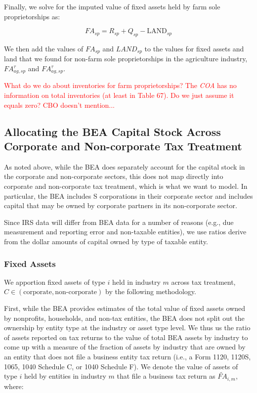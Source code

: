 \documentclass[article,11pt,letterpaper,fleqn]{article}
\theoremstyle{definition}
\numberwithin{equation}{section}
\begin{document}
Finally, we solve for the imputed value of fixed assets held by farm sole proprietorships as: 

\begin{equation}
{FA}_{sp}=R_{sp}+Q_{sp}-\text{LAND}_{sp}
\end{equation}

We then add the values of ${FA}_{sp}$ and ${LAND}_{sp}$ to the values for fixed assets and land that we found for non-farm sole proprietorships in the agriculture industry, ${FA}^{\tau}_{ag,sp}$ and ${FA}^{\tau}_{ag,sp}$.

\textcolor{red}{What do we do about inventories for farm proprietorships?  The \emph{COA} has no information on total inventories (at least in Table 67).   Do we just assume it equals zero?  CBO doesn't mention...}


\subsection{Allocating the BEA Capital Stock Across Corporate and Non-corporate Tax Treatment} 

As noted above, while the BEA does separately account for the capital stock in the corporate and non-corporate sectors, this does not map directly into corporate and non-corporate tax treatment, which is what we want to model.  In particular, the BEA includes S corporations in their corporate sector and includes capital that may be owned by corporate partners in its non-corporate sector.  

Since IRS data will differ from BEA data for a number of reasons (e.g., due measurement and reporting error and non-taxable entities), we use ratios derive from the dollar amounts of capital owned by type of taxable entity. 

\subsubsection{Fixed Assets}
We apportion fixed assets of type $i$ held in industry $m$ across tax treatment, $C\in(\text{corporate},\text{non-corporate})$ by the following methodology.

First, while the BEA provides estimates of the total value of fixed assets owned by nonprofits, households, and non-tax entities, the BEA does not split out the ownership by entity type at the industry or asset type level.  We thus us the ratio of assets reported on tax returns to the value of total BEA assets by industry to come up with a measure of the fraction of assets by industry that are owned by an entity that does not file a business entity tax return (i.e., a Form 1120, 1120S, 1065, 1040 Schedule C, or 1040 Schedule F).  We denote the value of assets of type $i$ held by entities in industry $m$ that file a business tax return as $\widetilde{FA}_{i,m}$, where:
\end{document}
